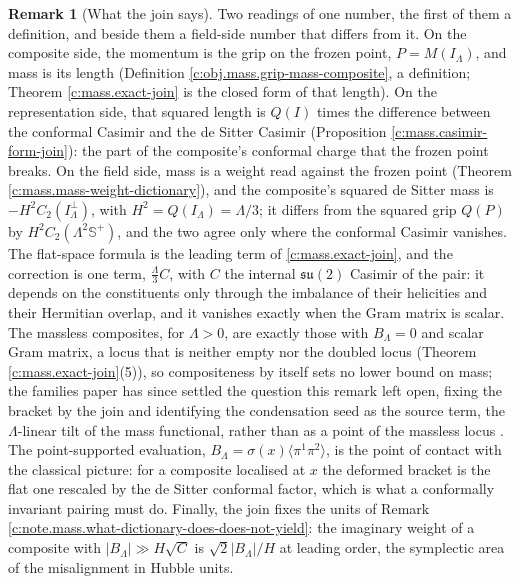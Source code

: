 \documentclass[11pt]{article}
\theoremstyle{definition}
\newtheorem{remark}[theorem]{Remark}
\theoremstyle{plain}
\newcommand{\changedmark}[2]{\marginpar{\raggedright\scriptsize\color{#1}#2}}
\providecommand{\CS}{}\renewcommand{\CS}{{\mathbb{S}^{+}}}
\providecommand{\br}{}\renewcommand{\br}[1]{\langle #1\rangle}
\begin{document}
\begin{remark}[What the join says]\label{c:note.mass.what-join-says}
\changedmark{BrickRed}{corrected since the deposit}
Two readings of one number, the first of them a definition, and beside them a field-side number that differs from it. On the composite side, the momentum is the grip on the frozen point, $P = M(I_{\Lambda})$, and mass is its length (Definition \ref{c:obj.mass.grip-mass-composite}, a definition; Theorem \ref{c:mass.exact-join} is the closed form of that length). On the representation side, that squared length is $Q(I)$ times the difference between the conformal Casimir and the de Sitter Casimir (Proposition \ref{c:mass.casimir-form-join}): the part of the composite's conformal charge that the frozen point breaks. On the field side, mass is a weight read against the frozen point (Theorem \ref{c:mass.mass-weight-dictionary}), and the composite's squared de Sitter mass is $-H^{2}C_{2}(I_{\Lambda}^{\perp})$, with $H^{2} = Q(I_{\Lambda}) = \Lambda/3$; it differs from the squared grip $Q(P)$ by $H^{2}C_{2}(\Lambda^{2}\CS)$, and the two agree only where the conformal Casimir vanishes. The flat-space formula is the leading term of \ref{c:mass.exact-join}, and the correction is one term, $\tfrac{\Lambda}{3}C$, with $C$ the internal $\mathfrak{su}(2)$ Casimir of the pair: it depends on the constituents only through the imbalance of their helicities and their Hermitian overlap, and it vanishes exactly when the Gram matrix is scalar. The massless composites, for $\Lambda > 0$, are exactly those with $B_{\Lambda} = 0$ and scalar Gram matrix, a locus that is neither empty nor the doubled locus (Theorem \ref{c:mass.exact-join}(5)), so compositeness by itself sets no lower bound on mass; the families paper has since settled the question this remark left open, fixing the bracket by the join and identifying the condensation seed as the source term, the $\Lambda$-linear tilt of the mass functional, rather than as a point of the massless locus \cite[Props.~4.1-4.2]{ButlerT13}. The point-supported evaluation, $B_{\Lambda} = \sigma(x)\br{\pi^{1}\pi^{2}}$, is the point of contact with the classical picture: for a composite localised at $x$ the deformed bracket is the flat one rescaled by the de Sitter conformal factor, which is what a conformally invariant pairing must do. Finally, the join fixes the units of Remark \ref{c:note.mass.what-dictionary-does-does-not-yield}: the imaginary weight of a composite with $|B_{\Lambda}| \gg H\sqrt{C}$ is $\sqrt{2}|B_{\Lambda}|/H$ at leading order, the symplectic area of the misalignment in Hubble units.
\end{remark}
\end{document}
